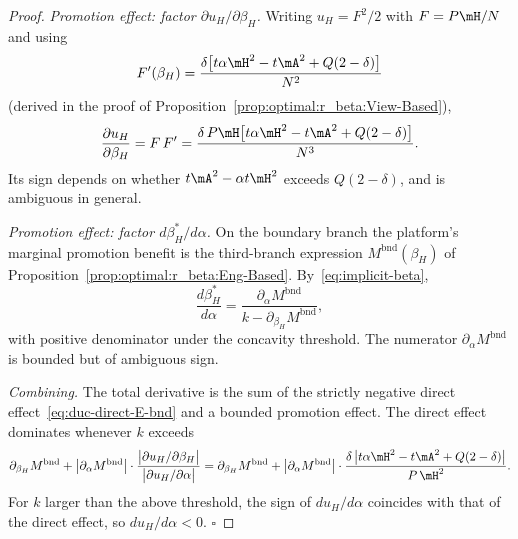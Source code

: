 \begin{proof}
\textit{Promotion effect: factor $\partial u_H/\partial\beta_H$.}\;
Writing $u_H = F^2/2$ with $F = P\mH/N$ and using
\[
F'(\beta_H) = \frac{\delta\bigl[t\alpha\mH^2 - t\mA^2 + Q(2-\delta)\bigr]}{N^2}
\]
(derived in the proof of Proposition~\ref{prop:optimal:r_beta:View-Based}),
\begin{equation}\label{eq:duc-dbeta-E-bnd}
\frac{\partial u_H}{\partial\beta_H}
= F\,F'
= \frac{\delta\,P\mH\bigl[t\alpha\mH^2 - t\mA^2 + Q(2-\delta)\bigr]}{N^3}.
\end{equation}
Its sign depends on whether $t\mA^2 - \alpha t\mH^2$ exceeds $Q(2-\delta)$,
and is ambiguous in general.

\textit{Promotion effect: factor $d\beta_H^*/d\alpha$.}\;
On the boundary branch the platform's marginal promotion benefit is the
third-branch expression $M^{\mathrm{bnd}}(\beta_H)$ of
Proposition~\ref{prop:optimal:r_beta:Eng-Based}. By~\eqref{eq:implicit-beta},
\[
\frac{d\beta_H^*}{d\alpha}
= \frac{\partial_\alpha M^{\mathrm{bnd}}}{k - \partial_{\beta_H} M^{\mathrm{bnd}}},
\]
with positive denominator under the concavity threshold. The numerator
$\partial_\alpha M^{\mathrm{bnd}}$ is bounded but of ambiguous sign.

\textit{Combining.}\;
The total derivative is the sum of the strictly negative direct
effect~\eqref{eq:duc-direct-E-bnd} and a bounded promotion effect. The
direct effect dominates whenever $k$ exceeds
\[
\partial_{\beta_H} M^{\mathrm{bnd}}
+ \bigl|\partial_\alpha M^{\mathrm{bnd}}\bigr|
\cdot\frac{\bigl|\partial u_H/\partial\beta_H\bigr|}{\bigl|\partial u_H/\partial\alpha\bigr|}
= \partial_{\beta_H} M^{\mathrm{bnd}}
+ \bigl|\partial_\alpha M^{\mathrm{bnd}}\bigr|
\cdot\frac{\delta\,\bigl|t\alpha\mH^2 - t\mA^2 + Q(2-\delta)\bigr|}{P\,\mH^2}.
\]
For $k$ larger than the above threshold, the sign of $du_H/d\alpha$
coincides with that of the direct effect, so $du_H/d\alpha < 0$.
\hfill $\square$
\end{proof}




